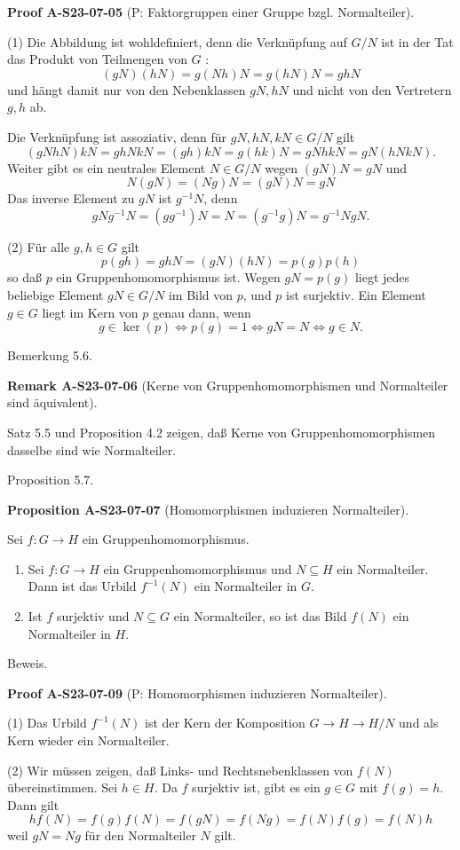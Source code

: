 \documentclass[10pt, letterpaper]{article}
\newcommand{\CustomHeading}[3]{%
  \par\medskip\noindent%
  \textbf{#1 #2} \textnormal{(#3)}.\enskip%
}
\newenvironment{PROP}[2]{\begin{unitbox}\CustomHeading{Proposition}{#1}{#2}}{\end{unitbox}}
\newenvironment{REM}[2]{\begin{unitbox}\CustomHeading{Remark}{#1}{#2}}{\end{unitbox}}
\newenvironment{PROOF}[2]{\begin{unitbox}\CustomHeading{Proof}{#1}{#2}}{\end{unitbox}}
\begin{document}
\begin{PROOF}{A-S23-07-05}{P: Faktorgruppen einer Gruppe bzgl. Normalteiler}
(1) Die Abbildung ist wohldefiniert, denn die Verknüpfung auf $G / N$ ist in der Tat das Produkt von Teilmengen von $G$ :
$$
(g N)(h N)=g(N h) N=g(h N) N=g h N
$$
und hängt damit nur von den Nebenklassen $g N, h N$ und nicht von den Vertretern $g, h$ ab.

Die Verknüpfung ist assoziativ, denn für $g N, h N, k N \in G / N$ gilt
$$
(g N h N) k N=g h N k N=(g h) k N=g(h k) N=g N h k N=g N(h N k N) .
$$
Weiter gibt es ein neutrales Element $N \in G / N$ wegen $(g N) N=g N$ und
$$
N(g N)=(N g) N=(g N) N=g N
$$
Das inverse Element zu $g N$ ist $g^{-1} N$, denn
$$
g N g^{-1} N=\left(g g^{-1}\right) N=N=\left(g^{-1} g\right) N=g^{-1} N g N .
$$

(2) Für alle $g, h \in G$ gilt
$$
p(g h)=g h N=(g N)(h N)=p(g) p(h)
$$
so daß $p$ ein Gruppenhomomorphismus ist. Wegen $g N=p(g)$ liegt jedes beliebige Element $g N \in G / N$ im Bild von $p$, und $p$ ist surjektiv. Ein Element $g \in G$ liegt im Kern von $p$ genau dann, wenn
$$
g \in \operatorname{ker}(p) \Longleftrightarrow p(g)=1 \Longleftrightarrow g N=N \Longleftrightarrow g \in N .
$$
\end{PROOF}


Bemerkung 5.6. 

\begin{REM}{A-S23-07-06}{Kerne von Gruppenhomomorphismen und Normalteiler sind äquivalent}
Satz 5.5 und Proposition 4.2 zeigen, daß Kerne von Gruppenhomomorphismen dasselbe sind wie Normalteiler.
\end{REM}

Proposition 5.7. 

\begin{PROP}{A-S23-07-07}{Homomorphismen induzieren Normalteiler}
Sei $f: G \rightarrow H$ ein Gruppenhomomorphismus.
\begin{enumerate}
  \item Sei \( f: G \to H \) ein Gruppenhomomorphismus und \( N \subseteq H \) ein Normalteiler. Dann ist das Urbild \( f^{-1}(N) \) ein Normalteiler in \( G \).

  \item Ist \( f \) surjektiv und \( N \subseteq G \) ein Normalteiler, so ist das Bild \( f(N) \) ein Normalteiler in \( H \).
\end{enumerate}
\end{PROP}

Beweis. 

\begin{PROOF}{A-S23-07-09}{P: Homomorphismen induzieren Normalteiler}
(1) Das Urbild $f^{-1}(N)$ ist der Kern der Komposition $G \rightarrow H \rightarrow H / N$ und als Kern wieder ein Normalteiler.

(2) Wir müssen zeigen, daß Links- und Rechtsnebenklassen von $f(N)$ übereinstimmen. Sei $h \in H$. Da $f$ surjektiv ist, gibt es ein $g \in G$ mit $f(g)=h$. Dann gilt
$$
h f(N)=f(g) f(N)=f(g N)=f(N g)=f(N) f(g)=f(N) h
$$
weil $g N=N g$ für den Normalteiler $N$ gilt.
\end{PROOF}
\end{document}
